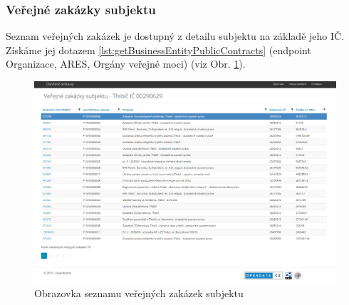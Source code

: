












\subsubsection*{Veřejné zakázky subjektu}

Seznam veřejných zakázek je dostupný z detailu subjektu na základě jeho IČ. Získáme jej dotazem \ref{lst:getBusinessEntityPublicContracts} (endpoint Organizace, ARES, Orgány veřejné moci) (viz Obr. \ref{obr:webPublicContracts}).\\

\begin{figure}[H]
\centerline{\includegraphics[width=\textwidth]{img/webPublicContracts.eps}}
\caption{Obrazovka seznamu veřejných zakázek subjektu}
\label{obr:webPublicContracts}
\end{figure}

